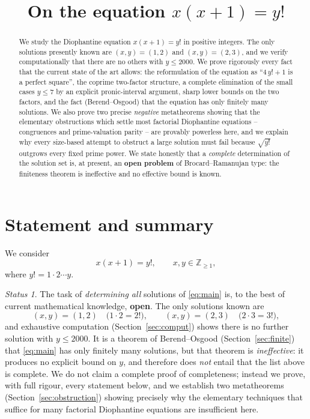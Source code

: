\documentclass{amsart}
\theoremstyle{plain}
\theoremstyle{remark}
\newtheorem*{statusnote}{Status}
\begin{document}
\title{On the equation $x(x+1)=y!$}
\maketitle

\begin{abstract}
We study the Diophantine equation $x(x+1)=y!$ in positive integers.
The only solutions presently known are $(x,y)=(1,2)$ and $(x,y)=(2,3)$,
and we verify computationally that there are no others with $y\le 2000$.
We prove rigorously every fact that the current state of the art allows:
the reformulation of the equation as ``$4\,y!+1$ is a perfect square'',
the coprime two-factor structure, a complete elimination of the small
cases $y\le 7$ by an explicit pronic-interval argument, sharp lower bounds
on the two factors, and the fact (Berend--Osgood) that the equation has
only finitely many solutions.  We also prove two precise \emph{negative}
metatheorems showing that the elementary obstructions which settle most
factorial Diophantine equations -- congruences and prime-valuation parity --
are provably powerless here, and we explain why every size-based attempt to
obstruct a large solution must fail because $\sqrt{y!}$ outgrows every fixed
prime power.  We state honestly that a \emph{complete} determination of the
solution set is, at present, an \textbf{open problem} of Brocard--Ramanujan
type: the finiteness theorem is ineffective and no effective bound is known.
\end{abstract}

\section{Statement and summary}

We consider
\begin{equation}\label{eq:main}
   x(x+1)=y!,\qquad x,y\in\mathbb{Z}_{\ge 1},
\end{equation}
where $y!=1\cdot 2\cdots y$.

\begin{statusnote}
The task of \emph{determining all} solutions of \eqref{eq:main} is, to the
best of current mathematical knowledge, \textbf{open}.  The only solutions
known are
\[
   (x,y)=(1,2)\quad\bigl(1\cdot 2=2!\bigr),\qquad
   (x,y)=(2,3)\quad\bigl(2\cdot 3=3!\bigr),
\]
and exhaustive computation (Section~\ref{sec:comput}) shows there is no
further solution with $y\le 2000$.  It is a theorem of Berend--Osgood
(Section~\ref{sec:finite}) that \eqref{eq:main} has only finitely many
solutions, but that theorem is \emph{ineffective}: it produces no explicit
bound on $y$, and therefore does \emph{not} entail that the list above is
complete.  We do not claim a complete proof of completeness; instead we
prove, with full rigour, every statement below, and we establish two
metatheorems (Section~\ref{sec:obstruction}) showing precisely why the
elementary techniques that suffice for many factorial Diophantine equations
are insufficient here.
\end{statusnote}
\end{document}
